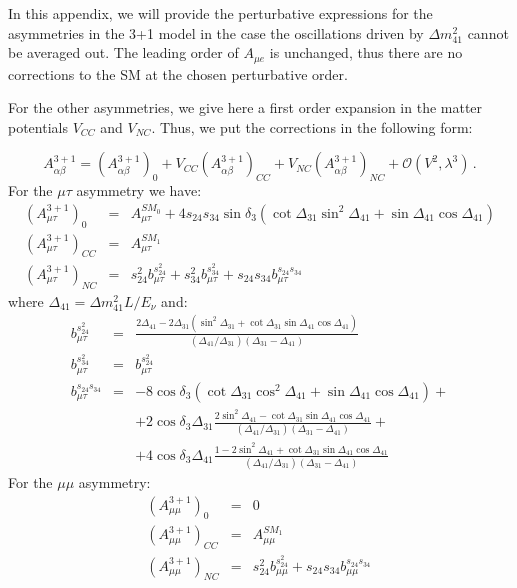 \documentclass[12pt]{article}
\begin{document}
In this appendix, we will provide the perturbative expressions for the asymmetries in the 3+1 model in the case  the oscillations driven by $\Delta m_{41}^2$ cannot be averaged out. 
The leading order of $A_{\mu e}$ is unchanged, thus there are no corrections to the SM at the chosen perturbative order.

For the other asymmetries, we give here a first order expansion in the matter potentials $V_{CC}$ and $V_{NC}$. Thus, we put the corrections in the following form:

\begin{equation}
    A_{\alpha\beta}^{3+1}=(A_{\alpha\beta}^{3+1})_0+V_{CC} (A_{\alpha\beta}^{3+1})_{CC}+V_{NC} (A_{\alpha\beta}^{3+1})_{NC}+\mathcal{O}(V^2,\lambda^3)\,.
\end{equation}
For the $\mu\tau$ asymmetry we have:
\begin{eqnarray}
 (A_{\mu \tau}^{3+1})_0 &=& A_{\mu\tau}^{SM_0}+4 s_{24}s_{34} \sin\delta_3(\cot\Delta_{31}\sin^2\Delta_{41}+\sin\Delta_{41}\cos\Delta_{41}) \nonumber \\
 (A_{\mu \tau}^{3+1})_{CC} &=& A_{\mu\tau}^{SM_1} \\
(A_{\mu \tau}^{3+1})_{NC} &=& s_{24}^2 b_{\mu\tau}^{s_{24}^2}+s_{34}^2 b_{\mu\tau}^{s_{34}^2}+s_{24}s_{34} b_{\mu\tau}^{s_{24}s_{34}}\nonumber
\end{eqnarray}
where $\Delta_{41} = \Delta m^2_{41} L/E_\nu$ and:
\begin{eqnarray}
 b_{\mu\tau}^{s_{24}^2} &=& \frac{2\Delta_{41}-2\Delta_{31}(\sin^2\Delta_{31}+\cot\Delta_{31}\sin\Delta_{41}\cos\Delta_{41})}{(\Delta_{41}/\Delta_{31})(\Delta_{31}-\Delta_{41})} \\
 b_{\mu\tau}^{s_{34}^2} &=& b_{\mu\tau}^{s_{24}^2}
 \\
 b_{\mu\tau}^{s_{24}s_{34}} \nonumber &=&-8\cos\delta_3(\cot\Delta_{31}\cos^2\Delta_{41}+\sin\Delta_{41}\cos\Delta_{41})+\\
 \nonumber & & +2\cos\delta_{3}\Delta_{31}\frac{2\sin^2\Delta_{41}-\cot\Delta_{31}\sin\Delta_{41}\cos\Delta_{41}}{(\Delta_{41}/\Delta_{31})(\Delta_{31}-\Delta_{41})}+\\
 & & +4\cos\delta_{3}\Delta_{41}\frac{1-2\sin^2\Delta_{41}+\cot\Delta_{31}\sin\Delta_{41}\cos\Delta_{41}}{(\Delta_{41}/\Delta_{31})(\Delta_{31}-\Delta_{41})}
\end{eqnarray}
For the $\mu\mu$ asymmetry: 
\begin{eqnarray}
 (A_{\mu \mu}^{3+1})_0 &=& 0 \nonumber \\
 (A_{\mu \mu}^{3+1})_{CC} &=& A_{\mu\mu}^{SM_1} \\
(A_{\mu \mu}^{3+1})_{NC} &=& s_{24}^2 b_{\mu\mu}^{s_{24}^2}+s_{24}s_{34} b_{\mu\mu}^{s_{24}s_{34}}\nonumber\,
\end{eqnarray}
\end{document}
